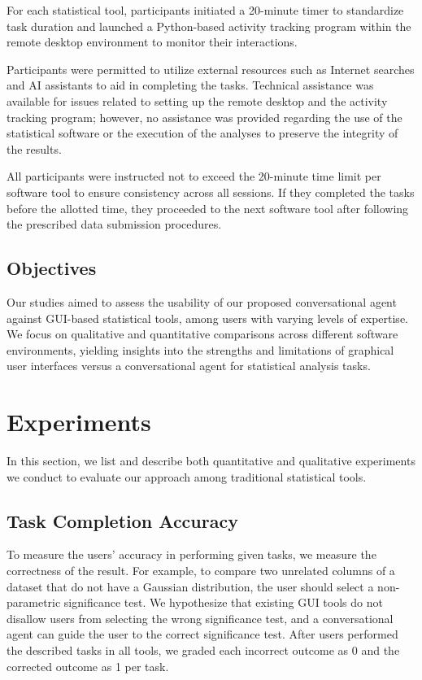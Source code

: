 \documentclass{article}
\begin{document}
For each statistical tool, participants initiated a 20-minute timer to standardize task duration and launched a Python-based activity tracking program within the remote desktop environment to monitor their interactions. 

Participants were permitted to utilize external resources such as Internet searches and AI assistants to aid in completing the tasks. Technical assistance was available for issues related to setting up the remote desktop and the activity tracking program; however, no assistance was provided regarding the use of the statistical software or the execution of the analyses to preserve the integrity of the results.

All participants were instructed not to exceed the 20-minute time limit per software tool to ensure consistency across all sessions. If they completed the tasks before the allotted time, they proceeded to the next software tool after following the prescribed data submission procedures.

\subsection{Objectives}
Our studies aimed to assess the usability of our proposed conversational agent against GUI-based statistical tools, among users with varying levels of expertise. We focus on qualitative and quantitative comparisons across different software environments, yielding insights into the strengths and limitations of graphical user interfaces versus a conversational agent for statistical analysis tasks.

\section{Experiments}
In this section, we list and describe both quantitative and qualitative experiments we conduct to evaluate our approach among traditional statistical tools.

\subsection{Task Completion Accuracy}
To measure the users' accuracy in performing given tasks, we measure the correctness of the result. For example, to compare two unrelated columns of a dataset that do not have a Gaussian distribution, the user should select a non-parametric significance test. We hypothesize that existing GUI tools do not disallow users from selecting the wrong significance test, and a conversational agent can guide the user to the correct significance test. 
After users performed the described tasks in all tools, we graded each incorrect outcome as 0 and the corrected outcome as 1 per task.
\end{document}
